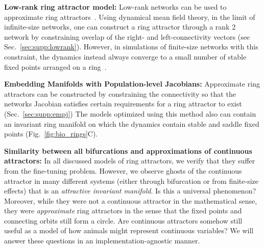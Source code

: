 \documentclass{article} %
\newcommand{\ptitle}[1]{\textbf{#1:}\xspace}
\newcommand{\mpcomment}[1]{\textcolor{mpcolor}{(#1)}}
\newcounter{ct}
\theoremstyle{definition}
\theoremstyle{remark}
\begin{document}
\ptitle{Low-rank ring attractor model} %
Low-rank networks can be used to approximate ring attractors~\citep{mastrogiuseppe2018, beiran2021}.
Using dynamical mean field theory, in the limit of infinite-size networks, one can construct a ring attractor through a rank 2 network by constraining overlap of the right- and left-connectivity vectors (see Sec.~\ref{sec:supp:lowrank}).
However, in simulations of finite-size networks with this constraint, the dynamics instead always converge to a small number of stable fixed points arranged on a ring~\citep{mastrogiuseppe2018}.

\ptitle{Embedding Manifolds with Population-level Jacobians} %
Approximate ring attractors can be constructed by constraining the connectivity so that the networks Jacobian satisfies certain requirements for a ring attractor to exist~\citep{pollock2020} (Sec.~\ref{sec:supp:empj})
The models optimized using this method also can contain an invariant ring manifold on which the dynamics contain stable and saddle fixed points (Fig.~\ref{fig:bio_rings}C).

\ptitle{Similarity between all bifurcations and approximations of continuous attractors}
In all discussed models of ring attractors, we verify that they suffer from the fine-tuning problem.
However, we observe ghosts of the continuous attractor in many different systems (either through bifurcation or from finite-size effects) that is an \emph{attractive invariant manifold}.
Is this a universal phenomenon?
Moreover, while they were not a continuous attractor in the mathematical sense, they were \textit{approximate} ring attractors in the sense that the fixed points and connecting orbits still form a circle.
Are continuous attractors somehow still useful as a model of how animals might represent continuous variables?
We will answer these questions in an implementation-agnostic manner.


\end{document}
